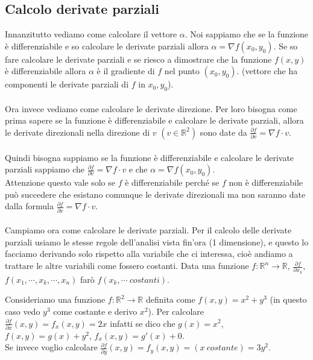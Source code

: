 \subsection{Calcolo derivate parziali}
Innanzitutto vediamo come calcolare il vettore $\alpha$. Noi sappiamo che se la funzione è differenziabile e so calcolare le derivate parziali allora $\alpha = \nabla f(x_0, y_0)$. Se so fare calcolare le derivate parziali e se riesco a dimostrare che la funzione $f(x,y)$ è differenziabile allora $\alpha$ è il gradiente di $f$ nel punto $(x_0, y_0)$. (vettore che ha componenti le derivate parziali di $f$ in $x_0, y_0$).\\\\
Ora invece vediamo come calcolare le derivate direzione. Per loro bisogna come prima sapere se la funzione è differenziabile e calcolare le derivate parziali, allora le derivate direzionali nella direzione di $v$ $(v \in \mathbb{R}^2)$ sono date da $\frac{\partial f}{\partial v} = \nabla f \cdot v$.\\\\
Quindi bisogna sappiamo se la funzione è differenziabile e calcolare le derivate parziali sappiamo che $\frac{\partial f}{\partial v} = \nabla f \cdot v$ e che $\alpha = \nabla f(x_0, y_0)$.\\
Attenzione questo vale solo se $f$ è differenziabile perché se $f$ non è differenziabile può succedere che esistano comunque le derivate direzionali ma non saranno date dalla formula $\frac{\partial f}{\partial v} = \nabla f \cdot v$.\\\\
Campiamo ora come calcolare le derivate parziali. Per il calcolo delle derivate parziali usiamo le stesse regole dell'analisi vista fin'ora (1 dimensione), e questo lo facciamo derivando solo rispetto alla variabile che ci interessa, cioè andiamo a trattare le altre variabili come fossero costanti. Data una funzione $f: \mathbb{R}^n \to \mathbb{R}$, $\frac{\partial f}{\partial x_k}$, $f(x_1, \cdots, x_k, \cdots, x_n)$ farò $f(x_k, \cdots \: costanti)$.

\begin{example}
Consideriamo una funzione $f: \mathbb{R}^2 \to \mathbb{R}$ definita come $f(x,y) = x^2 + y^3$ (in questo caso vedo $y^3$ come costante e derivo $x^2$). Per calcolare $\frac{\partial f}{\partial x}(x,y) = f_x(x,y) = 2x$ infatti se dico che $g(x) = x^2$, $f(x,y) = g(x) + y^2$, $f_x(x,y) = g'(x) + 0$. \\
Se invece voglio calcolare $\frac{\partial f}{\partial y}(x,y) = f_y(x,y) = (x \: costante) = 3y^2$.
\end{example}

